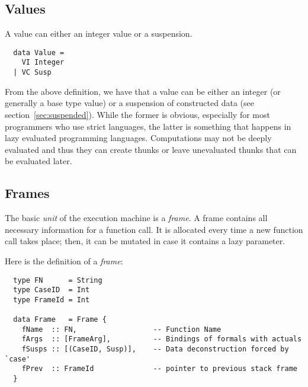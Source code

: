\documentclass[diploma]{softlab-thesis}
\begin{document}
\subsection{Values}
\label{sec:values}

A value can either an integer value or a suspension.

\begin{verbatim}
  data Value = 
    VI Integer 
  | VC Susp 
\end{verbatim}

From the above definition, we have that a value can be either an integer (or generally a base type 
value) or a suspension of constructed data (see section~\ref{sec:suspended}). While the former is obvious, especially 
for most programmers who use strict languages, the latter is something that happens in lazy evaluated 
programming languages. Computations may not be deeply evaluated and thus they can create thunks or 
leave unevaluated thunks that can be evaluated later.

\subsection{Frames}
\label{sec:frames}

The basic \textit{unit} of the execution machine is a \textit{frame}. A frame contains all necessary information 
for a function call. It is allocated every time a new function call takes place; then, it can be mutated in case it contains
a lazy parameter.
\newline
\par Here is the definition of a \textit{frame}:
\begin{verbatim}
  type FN      = String 
  type CaseID  = Int 
  type FrameId = Int 

  data Frame   = Frame {
    fName  :: FN,                  -- Function Name
    fArgs  :: [FrameArg],          -- Bindings of formals with actuals
    fSusps :: [(CaseID, Susp)],    -- Data deconstruction forced by `case'
    fPrev  :: FrameId              -- pointer to previous stack frame 
  }
\end{verbatim}
\end{document}
